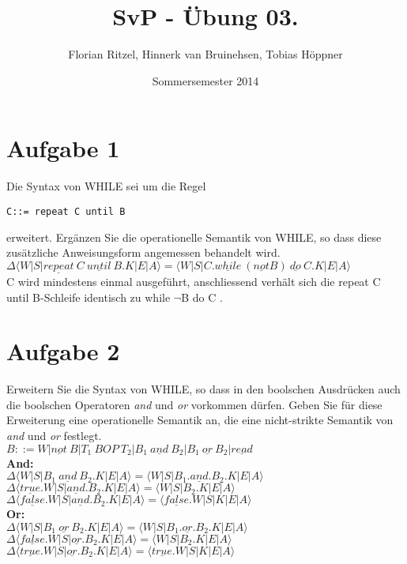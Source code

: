 \documentclass[ngerman,a4paper]{report}
\author{Florian Ritzel, Hinnerk van Bruinehsen, Tobias Höppner}
\title{SvP - Übung 03. }
\date{Sommersemester 2014}
\renewcommand{\maketitle}{}
\begin{document}
\maketitle
\section*{Aufgabe 1}
Die Syntax von WHILE sei um die Regel
\begin{lstlisting}
C::= repeat C until B
\end{lstlisting}
erweitert. Ergänzen Sie die operationelle Semantik von WHILE, so dass diese zusätzliche Anweisungsform angemessen behandelt wird.\\

$\Delta\langle W|S|\underline{repeat}\ C\ \underline{until}\ B.K|E|A\rangle = \langle W|S|C.\underline{while}\ (\underline{not} B)\ \underline{do}\ C.K|E|A\rangle$\\
C wird mindestens einmal ausgeführt, anschliessend verhält sich die \glqq repeat C until B\grqq -Schleife identisch zu \glqq while $\neg$B do C \grqq .\\

\section*{Aufgabe 2}
Erweitern Sie die Syntax von WHILE, so dass in den boolschen Ausdrücken auch die boolschen Operatoren \textit{and} und \textit{or} vorkommen dürfen. Geben Sie für diese Erweiterung eine operationelle Semantik an, die eine nicht-strikte Semantik von \textit{and} und \textit{or} festlegt.\\

$B::=W| \underline{not}\ B| T_1\ BOP\ T_2| B_1\ \underline{and}\  B_2| B_1\ \underline{or}\ B_2| \underline{read}$\\

\textbf{And:}\\
$\Delta\langle W|S|B_1\ \underline{and}\ B_2.K|E|A\rangle = \langle W|S|B_1.\underline{and}.B_2.K|E|A\rangle$\\
$\Delta\langle \underline{true}.W|S|\underline{and}.B_2.K|E|A\rangle = \langle W|S|B_2.K|E|A\rangle$\\
$\Delta\langle \underline{false}.W|S|\underline{and}.B_2.K|E|A\rangle = \langle \underline{false}.W|S|K|E|A\rangle$\\

\textbf{Or:}\\
$\Delta\langle W|S|B_1\ \underline{or}\ B_2.K|E|A\rangle = \langle W|S|B_1.\underline{or}.B_2.K|E|A\rangle$\\
$\Delta\langle \underline{false}.W|S|\underline{or}.B_2.K|E|A\rangle = \langle W|S|B_2.K|E|A\rangle$\\
$\Delta\langle \underline{true}.W|S|\underline{or}.B_2.K|E|A\rangle = \langle \underline{true}.W|S|K|E|A\rangle$\\
\end{document}
